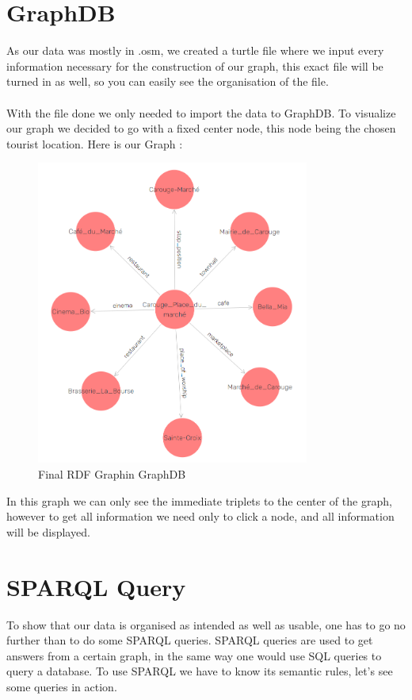 \documentclass[a4paper]{article}
\begin{document}
\section*{GraphDB}
As our data was mostly in .osm, we created a turtle file where we input every information necessary for the construction of our graph, this exact file will be turned in as well, so you can easily see the organisation of the file. \\\\
With the file done we only needed to import the data to GraphDB. To visualize our graph we decided to go with a fixed center node, this node being the chosen tourist location. Here is our Graph :

\begin{figure}[H]
\center
\includegraphics[width=0.8\textwidth]{images/Graph_graphdb.PNG}
\caption{Final RDF Graphin GraphDB}
\end{figure}
In this graph we can only see the immediate triplets to the center of the graph, however to get all information we need only to click a node, and all information will be displayed.

\newpage
\section*{SPARQL Query}
To show that our data is organised as intended as well as usable, one has to go no further than to do some SPARQL queries. SPARQL queries are used to get answers from a certain graph, in the same way one would use SQL queries to query a database. To use SPARQL we have to know its semantic rules, let's see some queries in action.\\\\
\end{document}
